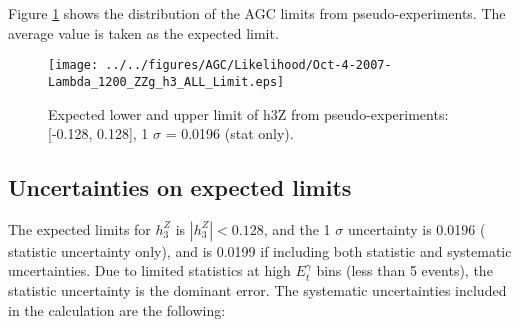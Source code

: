 \documentclass[12pt,twoside,letterpaper]{article}
\begin{document}
Figure \ref{Fig:h3ZExpected} shows the distribution of the AGC limits
from pseudo-experiments. The average value is taken as the expected
limit.
   \begin{figure}[htbp]
   \begin{center}
       \texttt{[image: ../../figures/AGC/Likelihood/Oct-4-2007-Lambda\_1200\_ZZg\_h3\_ALL\_Limit.eps]}
       \caption{Expected lower and upper limit of h3Z from
       pseudo-experiments: \hspace{8.2cm} [-0.128, 0.128], 1 $\sigma$
       = 0.0196 (stat only).}
       \label{Fig:h3ZExpected}
   \end{center}
   \end{figure}



\subsection{Uncertainties on expected limits}
The expected limits for $h_3^Z$ is $|h_3^Z| < 0.128$, and the 1
$\sigma$ uncertainty is 0.0196 ( statistic uncertainty only), and
 is 0.0199 if including both statistic and systematic uncertainties.
Due to limited statistics at high $E_t^{\gamma}$ bins (less than 5 events), the statistic uncertainty is the dominant error. 
The systematic uncertainties included in the calculation are the following:

\end{document}
